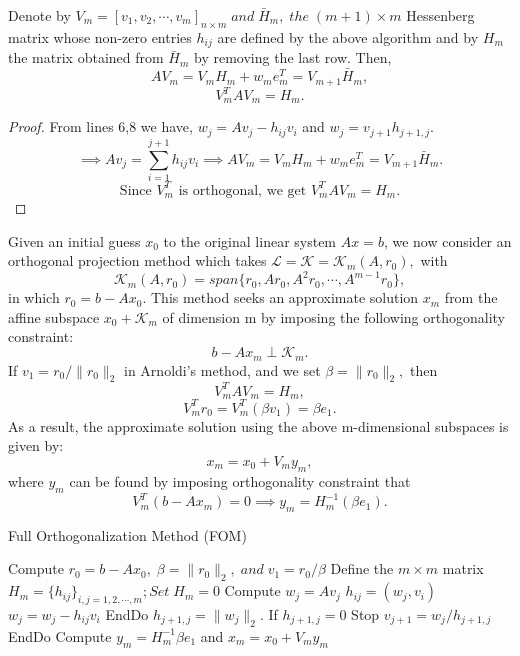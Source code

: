 \documentclass[10pt,a4paper]{article}
\begin{document}
\begin{prop}
Denote by $V_m=[v_1,v_2,\cdots,v_m]_{n\times m}\;and\;\bar{H}_m,\;the\;(m+1)\times m$ Hessenberg matrix whose non-zero entries $h_{ij}$ are defined by the above algorithm and by $H_m$ the matrix obtained from $\bar{H}_m$ by removing the last row. Then,
$$AV_m=V_mH_m+w_me^T_m=V_{m+1}\bar{H}_m,$$
$$V^T_mAV_m=H_m.$$
\end{prop}

\begin{proof}
From lines 6,8 we have, $w_j = Av_j - h_{ij}v_i$ and $w_j=v_{j+1}h_{j+1,j}.$
$$\implies Av_j = \sum^{j+1}_{i=1}h_{ij}v_i \implies AV_m = V_mH_m+w_me^T_m=V_{m+1}\bar{H}_m.$$
$$\text{Since }V^T_m\text{ is orthogonal, we get }V^T_mAV_m=H_m.$$
\end{proof}

Given an initial guess $x_0$ to the original linear system $Ax=b$, we now consider an orthogonal projection method which takes $\mathcal{L}=\mathcal{K}=\mathcal{K}_m(A,r_0),$ with
$$\mathcal{K}_m(A,r_0)=span\{r_0,Ar_0,A^2r_0,\cdots,A^{m-1}r_0\},$$
in which $r_0=b-Ax_0.$ This method seeks an approximate solution $x_m$ from the affine subspace $x_0+\mathcal{K}_m$ of dimension m by imposing the following orthogonality constraint:
$$b-Ax_m\perp \mathcal{K}_m.$$
If $v_1=r_0/\|r_0\|_2$ in Arnoldi's method, and we set $\beta=\|r_0\|_2,$ then
$$V^T_mAV_m=H_m,$$
$$V^T_mr_0=V^T_m(\beta v_1)=\beta e_1.$$
As a result, the approximate solution using the above m-dimensional subspaces is given by:
$$x_m=x_0+V_my_m,$$
where $y_m$ can be found by imposing orthogonality constraint that $$V^T_m(b-Ax_m)=0\implies y_m=H^{-1}_m(\beta e_1).$$

\begin{algorithm}
\caption{Full Orthogonalization Method (FOM)}
\begin{algorithmic}[1]
\State Compute $r_0=b-Ax_0,\;\beta=\|r_0\|_2,\;and\;v_1=r_0/\beta$
\State Define the $m\times m$ matrix $H_m = \{h_{ij}\}_{i,j=1,2,\cdots,m};Set\;H_m=0$
	\State Compute $w_j = Av_j$
		\State $h_{ij} = (w_j,v_i)$
		\State $w_j = w_j - h_{ij}v_i$
	\EndFor
	\State EndDo
	\State $h_{j+1,j} = \|w_j\|_2$. If $h_{j+1,j}=0$ Stop
	\State $v_{j+1}=w_j/h_{j+1,j}$
\EndFor
\State EndDo
\State Compute $y_m=H^{-1}_m\beta e_1$ and $x_m=x_0+V_my_m$
\end{algorithmic}
\end{algorithm}
\end{document}
